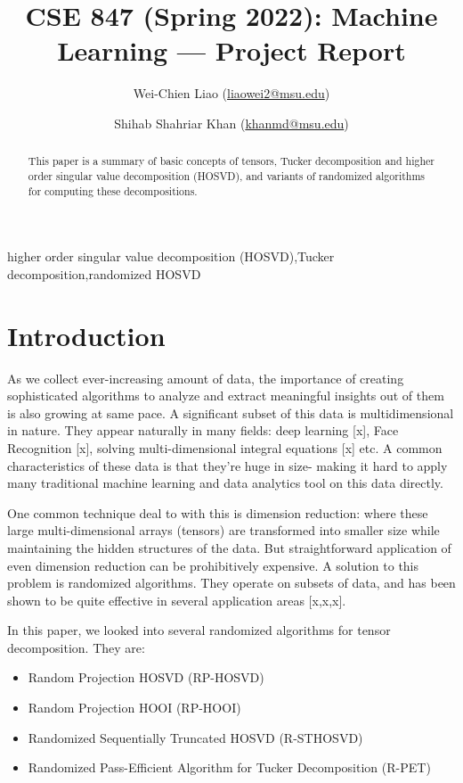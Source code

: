 \documentclass[preprint]{elsarticle}
\title{\textbf{\large{CSE 847 (Spring 2022): Machine Learning --- Project Report}}}
\author[1]{Wei-Chien Liao (\href{mailto:liaowei2@msu.edu}{liaowei2@msu.edu})}
\author[1]{Shihab Shahriar Khan (\href{mailto:khanmd@msu.edu}{khanmd@msu.edu})}
\date{}
\begin{document}
\begin{frontmatter}
\begin{abstract}
    This paper is a summary of basic concepts of tensors, Tucker decomposition and higher order singular value decomposition (HOSVD), and variants
    of randomized algorithms for computing these decompositions.
\end{abstract}
\begin{keyword}
    higher order singular value decomposition (HOSVD)\sep Tucker decomposition\sep randomized HOSVD
\end{keyword}
\end{frontmatter}
\section{Introduction}
As we collect ever-increasing amount of data, the importance of creating sophisticated algorithms to analyze and extract meaningful insights out of them is also growing at same pace. A significant subset of this data is multidimensional in nature. They appear naturally in many fields: deep learning [x], Face Recognition [x], solving multi-dimensional integral equations [x] etc. A common characteristics of these data is that they're huge in size- making it hard to apply many traditional machine learning and data analytics tool on this data directly.

\noident One common technique deal to with this is dimension reduction: where these large multi-dimensional arrays (tensors) are transformed into smaller size while maintaining the hidden structures of the data. But straightforward application of even dimension reduction can be prohibitively expensive. A solution to this problem is randomized algorithms. They operate on subsets of data, and has been shown to be quite effective in several application areas [x,x,x].

\noident In this paper, we looked into several randomized algorithms for tensor decomposition. They are:

\begin{itemize}
    \item Random Projection HOSVD (RP-HOSVD)
    \item Random Projection HOOI (RP-HOOI)
    \item Randomized Sequentially Truncated HOSVD (R-STHOSVD)
    \item Randomized Pass-Efficient Algorithm for Tucker Decomposition (R-PET)
\end{itemize}
\end{document}
